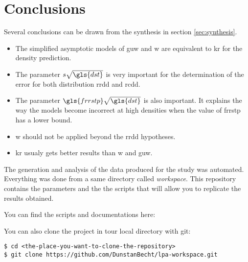 \section{Conclusions}

Several conclusions can be drawn from the synthesis in section \ref{sec:synthesis}.

\begin{itemize}
\item The simplified asymptotic models of \gls{guw} and \gls{w} are equivalent to \gls{kr} for the density prediction.
\item The parameter \( s \sqrt{\gls{dst}} \) is very important for the determination of the error for both distribution \gls{rrdd} and \gls{rcdd}.
\item The parameter \( \gls{frrstp} \sqrt{\gls{dst}} \) is also important. It explains the way the models become incorrect at high densities when the value of \gls{frrstp} has a lower bound.
\item \gls{w} should not be applied beyond the \gls{rrdd} hypotheses.
\item \gls{kr} usualy gets better results than \gls{w} and \gls{guw}.
\end{itemize}

The generation and analysis of the data produced for the study was automated.
Everything was done from a same directory called \textit{workspace}.
This repository contains the parameters and the the scripts that will allow you to replicate the results obtained.

\bigskip

You can find the scripts and documentations here: 

\bigskip

You can also clone the project in tour local directory with git:

\begin{tcolorbox}[width=\linewidth, title=shell]
\begin{verbatim}
$ cd <the-place-you-want-to-clone-the-repository>
$ git clone https://github.com/DunstanBecht/lpa-workspace.git
\end{verbatim}
\end{tcolorbox}
